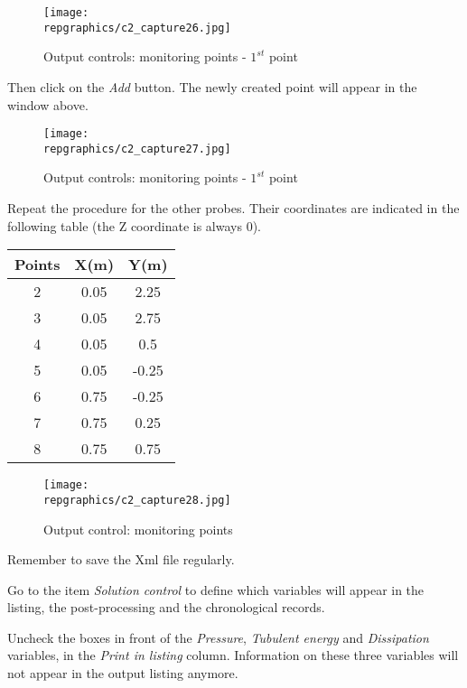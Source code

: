 \begin{figure}[h!]
\begin{center}
\texttt{[image: \\repgraphics/c2\_capture26.jpg]}
\caption{Output controls: monitoring points - $1^{st}$ point}
\label{fig26_e2}
\end{center}
\end{figure}


\newpage
Then click on the {\itshape Add} button. The newly created point will appear in
the window above.

\begin{figure}[h!]
\begin{center}
\texttt{[image: \\repgraphics/c2\_capture27.jpg]}
\caption{Output controls: monitoring points - $1^{st}$ point}
\label{fig27_e2}
\end{center}
\end{figure}


\newpage
Repeat the procedure for the other probes. Their coordinates are indicated in
the following table (the Z coordinate is always 0).
\begin{center}
\begin{tabular}{|c|c|c|}
\hline
Points & X(m) & Y(m) \\
\hline
2 & 0.05 & 2.25 \\
\hline
3 & 0.05 & 2.75 \\
\hline
4 & 0.05 & 0.5 \\
\hline
5 & 0.05 & -0.25 \\
\hline
6 & 0.75 & -0.25 \\
\hline
7 & 0.75 & 0.25 \\
\hline
8 & 0.75 & 0.75 \\
\hline
\end{tabular}
\end{center}

\begin{figure}[h!]
\begin{center}
\texttt{[image: \\repgraphics/c2\_capture28.jpg]}
\caption{Output control: monitoring points}
\label{fig28_e2}
\end{center}
\end{figure}

Remember to save the Xml file regularly.


\newpage
Go to the item {\itshape Solution control} to define which variables will
appear in the listing, the post-processing and the chronological records.

Uncheck the boxes in front of the {\itshape Pressure}, {\itshape Tubulent energy}
and {\itshape Dissipation} variables, in the {\itshape  Print in listing}
column. Information on these three variables will not appear in the output
listing anymore.

